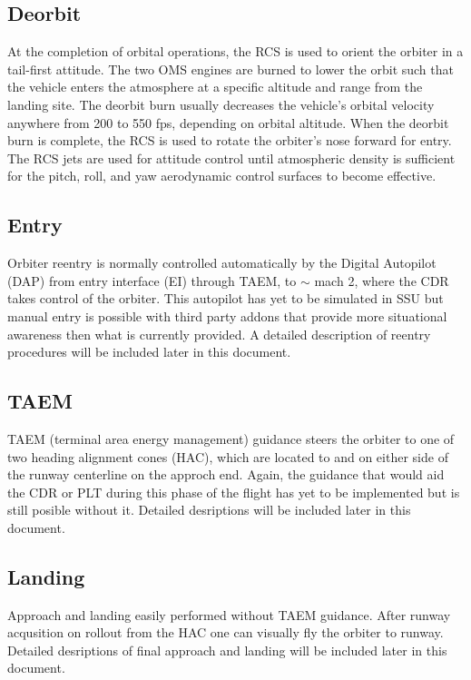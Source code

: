 \documentclass[13pt, letter,final]{article}
\begin{document}
\begin{multicols}{2}
\begin{center}
\subsection*{Deorbit}
\end{center}
At the completion of orbital operations, the RCS is used to orient the orbiter in a tail-first attitude. The two OMS engines are burned to lower the orbit such that the vehicle enters the atmosphere at a specific altitude and range from the landing site. The deorbit burn usually decreases the vehicle's orbital velocity anywhere from 200 to 550 fps, depending on orbital altitude.  When the deorbit burn is complete, the RCS is used to rotate the orbiter's nose forward for entry. The RCS jets are used for attitude control until atmospheric density is sufficient for the pitch, roll, and yaw aerodynamic control surfaces to become effective.
\\
\begin{center}
\subsection*{Entry}
\end{center}
Orbiter reentry is normally controlled automatically by the Digital Autopilot (DAP) from entry interface (EI) through TAEM, to $\sim$ mach 2, where the CDR takes control of the orbiter. This autopilot has yet to be simulated in SSU but manual entry is possible with third party addons that provide more situational awareness then what is currently provided.  A detailed description of reentry procedures will be included later in this document.
\\
\begin{center}
\subsection*{TAEM}
\end{center}
TAEM (terminal area energy management) guidance steers the orbiter to one of two heading alignment cones (HAC), which are located to and on either side of the runway centerline on the approch end.  Again, the guidance that would aid the CDR or PLT during this phase of the flight has yet to be implemented but is still posible without it. Detailed desriptions will be included later in this document.
\\
\begin{center}
\subsection*{Landing}
\end{center}
Approach and landing easily performed without TAEM guidance. After runway acqusition on rollout from the HAC one can visually fly the orbiter to runway. Detailed desriptions of final approach and landing will be included later in this document.\\


\end{multicols}
\end{document}
